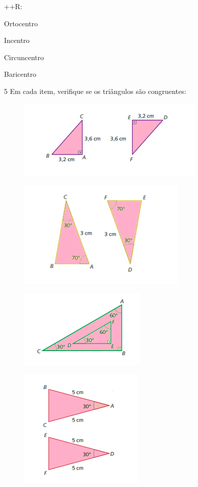 ++R:
\item Ortocentro
\item Incentro
\item Circuncentro
\item Baricentro

\num{5} Em cada item, verifique se os triângulos são congruentes:
\item
\begin{figure}[H]
\centering\includegraphics[width=3.51042in,height=1.48958in]{./imgSAEB_8_MAT/media/image19.png}
\end{figure}
\item
\begin{figure}[H]
\centering\includegraphics[width=3.16667in,height=2.03958in]{./imgSAEB_8_MAT/media/image20.png}
\end{figure}
\item
\begin{figure}[H]
\centering\includegraphics[width=2.38542in,height=1.47917in]{./imgSAEB_8_MAT/media/image21.png}
\end{figure}
\item
\begin{figure}[H]
\centering\includegraphics[width=2.35417in,height=2.23958in]{./imgSAEB_8_MAT/media/image22.png}
\end{figure}
